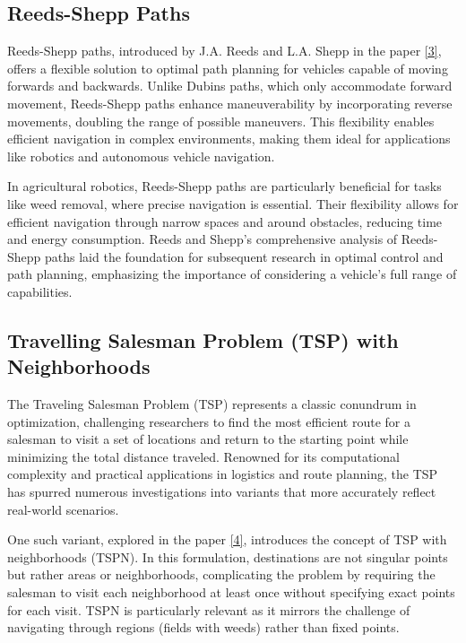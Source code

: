 \subsection{Reeds-Shepp Paths}

Reeds-Shepp paths, introduced by J.A. Reeds and L.A. Shepp in the paper \hyperlink{cite.reeds}{[3]}, offers a flexible solution to optimal path planning for vehicles capable of moving forwards and backwards. Unlike Dubins paths, which only accommodate forward movement, Reeds-Shepp paths enhance maneuverability by incorporating reverse movements, doubling the range of possible maneuvers. This flexibility enables efficient navigation in complex environments, making them ideal for applications like robotics and autonomous vehicle navigation.

\vspace*{6mm}

In agricultural robotics, Reeds-Shepp paths are particularly beneficial for tasks like weed removal, where precise navigation is essential. Their flexibility allows for efficient navigation through narrow spaces and around obstacles, reducing time and energy consumption. Reeds and Shepp's comprehensive analysis of Reeds-Shepp paths laid the foundation for subsequent research in optimal control and path planning, emphasizing the importance of considering a vehicle's full range of capabilities.





\subsection{Travelling Salesman Problem (TSP) with Neighborhoods} 

The Traveling Salesman Problem (TSP) represents a classic conundrum in optimization, challenging researchers to find the most efficient route for a salesman to visit a set of locations and return to the starting point while minimizing the total distance traveled. Renowned for its computational complexity and practical applications in logistics and route planning, the TSP has spurred numerous investigations into variants that more accurately reflect real-world scenarios.

\vspace*{6mm}

One such variant, explored in the paper \hyperlink{cite.TSPN}{[4]}, introduces the concept of TSP with neighborhoods (TSPN). In this formulation, destinations are not singular points but rather areas or neighborhoods, complicating the problem by requiring the salesman to visit each neighborhood at least once without specifying exact points for each visit. TSPN is particularly relevant as it mirrors the challenge of navigating through regions (fields with weeds) rather than fixed points.

